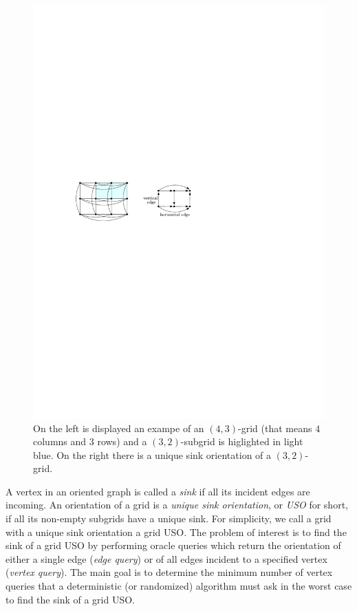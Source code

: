 \documentclass[runningheads,a4paper]{llncs}
\begin{document}
  \begin{figure}[htbp] 
  	\centering
  	\includegraphics{uso_example.pdf}
  	\caption{\small On the left is displayed an exampe of an $(4,3)$-grid (that means $4$ columns and $3$ rows) 
  	and a $(3,2)$-subgrid is higlighted in light blue. On the right there is a unique sink orientation of a $(3,2)$-grid.} 
  	\label{fig:examplegrid}
  \end{figure}

A vertex in an oriented graph is called a \emph{sink} if all its incident edges are incoming.
An orientation of a grid is a \emph{unique sink orientation}, or \emph{USO}
for short, if all its non-empty subgrids have a unique sink. For simplicity, we call a grid with a unique sink orientation a grid USO.
The problem of interest is to find the sink of a grid USO by performing oracle queries which return the orientation of either a single edge (\emph{edge query}) or of all edges incident to a specified vertex (\emph{vertex query}). 
The main goal is to determine the minimum number of vertex queries that a deterministic (or randomized) algorithm must ask in the worst case to find the sink of a grid USO.
\end{document}
